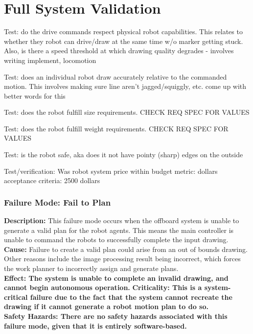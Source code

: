 
\section{Full System Validation}
\label{sec:system_validation}




Test: do the drive commands respect physical robot capabilities. This relates to whether they robot can drive/draw at the same time w/o marker getting stuck. Also, is there a speed threshold at which drawing quality degrades - involves writing implement, locomotion

Test: does an individual robot draw accurately relative to the commanded motion. This involves making sure line aren't jagged/squiggly, etc. come up with better words for this

Test: does the robot fulfill size requirements. CHECK REQ SPEC FOR VALUES

Test: does the robot fulfill weight requirements. CHECK REQ SPEC FOR VALUES

Test: is the robot safe, aka does it not have pointy (sharp) edges on the outside

Test/verification: Was robot system price within budget
metric: dollars
acceptance criteria: 2500 dollars



\subsubsection{Failure Mode: Fail to Plan}
\label{sec:sys_val_fm_bounds}

\textbf{Description:} This failure mode occurs when the offboard system is unable to generate a valid plan for the robot agents. This means the main controller is unable to command the robots to successfully complete the input drawing.\\
\textbf{Cause:} Failure to create a valid plan could arise from an out of bounds drawing. Other reasons include the image processing result being incorrect, which forces the work planner to incorrectly assign and generate plans.\\
\textbf{Effect: The system is unable to complete an invalid drawing, and cannot begin autonomous operation.}
\textbf{Criticality: This is a system-critical failure due to the fact that the system cannot recreate the drawing if it cannot generate a robot motion plan to do so.} \\
\textbf{Safety Hazards: There are no safety hazards associated with this failure mode, given that it is entirely software-based.} \\